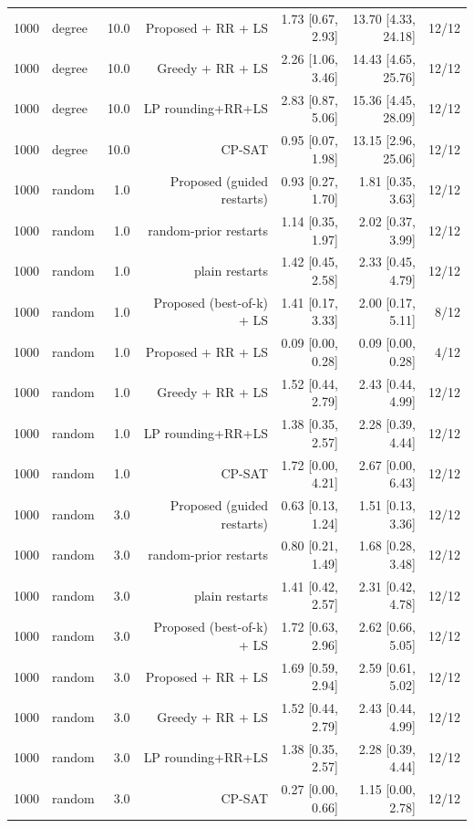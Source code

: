 \begin{table}[t]
\begin{tabular}{llrrrrr}
1000 & degree & 10.0 & Proposed + RR + LS & 1.73 [0.67, 2.93] & 13.70 [4.33, 24.18] & 12/12 \\
1000 & degree & 10.0 & Greedy + RR + LS & 2.26 [1.06, 3.46] & 14.43 [4.65, 25.76] & 12/12 \\
1000 & degree & 10.0 & LP rounding+RR+LS & 2.83 [0.87, 5.06] & 15.36 [4.45, 28.09] & 12/12 \\
1000 & degree & 10.0 & CP-SAT & 0.95 [0.07, 1.98] & 13.15 [2.96, 25.06] & 12/12 \\
1000 & random & 1.0 & Proposed (guided restarts) & 0.93 [0.27, 1.70] & 1.81 [0.35, 3.63] & 12/12 \\
1000 & random & 1.0 & random-prior restarts & 1.14 [0.35, 1.97] & 2.02 [0.37, 3.99] & 12/12 \\
1000 & random & 1.0 & plain restarts & 1.42 [0.45, 2.58] & 2.33 [0.45, 4.79] & 12/12 \\
1000 & random & 1.0 & Proposed (best-of-k) + LS & 1.41 [0.17, 3.33] & 2.00 [0.17, 5.11] & 8/12 \\
1000 & random & 1.0 & Proposed + RR + LS & 0.09 [0.00, 0.28] & 0.09 [0.00, 0.28] & 4/12 \\
1000 & random & 1.0 & Greedy + RR + LS & 1.52 [0.44, 2.79] & 2.43 [0.44, 4.99] & 12/12 \\
1000 & random & 1.0 & LP rounding+RR+LS & 1.38 [0.35, 2.57] & 2.28 [0.39, 4.44] & 12/12 \\
1000 & random & 1.0 & CP-SAT & 1.72 [0.00, 4.21] & 2.67 [0.00, 6.43] & 12/12 \\
1000 & random & 3.0 & Proposed (guided restarts) & 0.63 [0.13, 1.24] & 1.51 [0.13, 3.36] & 12/12 \\
1000 & random & 3.0 & random-prior restarts & 0.80 [0.21, 1.49] & 1.68 [0.28, 3.48] & 12/12 \\
1000 & random & 3.0 & plain restarts & 1.41 [0.42, 2.57] & 2.31 [0.42, 4.78] & 12/12 \\
1000 & random & 3.0 & Proposed (best-of-k) + LS & 1.72 [0.63, 2.96] & 2.62 [0.66, 5.05] & 12/12 \\
1000 & random & 3.0 & Proposed + RR + LS & 1.69 [0.59, 2.94] & 2.59 [0.61, 5.02] & 12/12 \\
1000 & random & 3.0 & Greedy + RR + LS & 1.52 [0.44, 2.79] & 2.43 [0.44, 4.99] & 12/12 \\
1000 & random & 3.0 & LP rounding+RR+LS & 1.38 [0.35, 2.57] & 2.28 [0.39, 4.44] & 12/12 \\
1000 & random & 3.0 & CP-SAT & 0.27 [0.00, 0.66] & 1.15 [0.00, 2.78] & 12/12 \\

\end{tabular}
\end{table}
